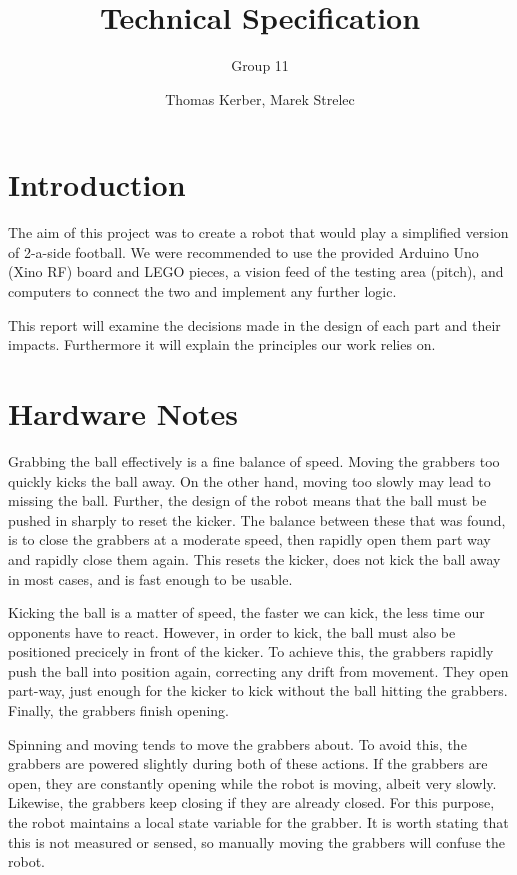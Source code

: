\documentclass[a4paper]{scrartcl}
\author{Thomas Kerber, Marek Strelec}
\title{Technical Specification}
\subtitle{Group 11}
\begin{document}
\maketitle




\section{Introduction}

The aim of this project was to create a robot that would play a simplified version of 2-a-side football. We were recommended to use the provided Arduino Uno (Xino RF) board and LEGO pieces, a vision feed of the testing area (pitch), and computers to connect the two and implement any further logic.

This report will examine the decisions made in the design of each part and their impacts. Furthermore it will explain the principles our work relies on.


\section{Hardware Notes}

Grabbing the ball effectively is a fine balance of speed. Moving the grabbers
too quickly kicks the ball away. On the other hand, moving too slowly may lead
to missing the ball. Further, the design of the robot means that the ball must
be pushed in sharply to reset the kicker. The balance between these that was
found, is to close the grabbers at a moderate speed, then rapidly open them
part way and rapidly close them again. This resets the kicker, does not kick the ball away in most cases, and is fast enough to be usable.

Kicking the ball is a matter of speed, the faster we can kick, the less time
our opponents have to react. However, in order to kick, the ball must also be
positioned precicely in front of the kicker. To achieve this, the grabbers
rapidly push the ball into position again, correcting any drift from movement.
They open part-way, just enough for the kicker to kick without the ball
hitting the grabbers. Finally, the grabbers finish opening.

Spinning and moving tends to move the grabbers about. To avoid this, the
grabbers are powered slightly during both of these actions. If the grabbers are
open, they are constantly opening while the robot is moving, albeit very
slowly. Likewise, the grabbers keep closing if they are already closed. For
this purpose, the robot maintains a local state variable for the grabber. It is
worth stating that this is not measured or sensed, so manually moving the
grabbers will confuse the robot.
\end{document}
